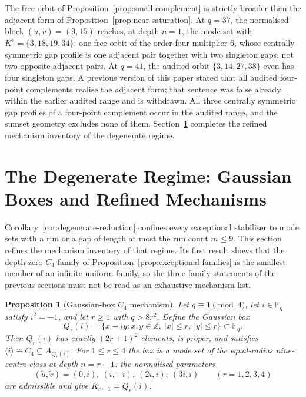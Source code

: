 \documentclass[11pt,a4paper]{article}
\newtheorem{proposition}[theorem]{Proposition}
\theoremstyle{definition}
\theoremstyle{remark}
\newcommand{\Fq}{\mathbb{F}_q}
\begin{document}
The free orbit of Proposition~\ref{prop:small-complement} is strictly broader than the
adjacent form of Proposition~\ref{prop:near-saturation}.
At $q=37$, the normalised block $(\widetilde u,\widetilde v)=(9,15)$ reaches, at depth
$n=1$, the mode set with $K^{\mathrm{c}}=\{3,18,19,34\}$: one free orbit of the order-four
multiplier $6$, whose centrally symmetric gap profile is one adjacent pair together with
two singleton gaps, not two opposite adjacent pairs.
At $q=41$, the audited orbit $\{3,14,27,38\}$ even has four singleton gaps.
A previous version of this paper stated that all audited four-point complements realise
the adjacent form; that sentence was false already within the earlier audited range and is
withdrawn.
All three centrally symmetric gap profiles of a four-point complement occur in the audited
range, and the sumset geometry excludes none of them.
Section~\ref{sec:degenerate} completes the refined mechanism inventory of the degenerate
regime.

\section{The Degenerate Regime: Gaussian Boxes and Refined Mechanisms}
\label{sec:degenerate}

Corollary~\ref{cor:degenerate-reduction} confines every exceptional stabiliser to mode sets
with a run or a gap of length at most the run count $m\leq9$.
This section refines the mechanism inventory of that regime.
Its first result shows that the depth-zero $C_4$ family of
Proposition~\ref{prop:exceptional-families} is the smallest member of an infinite uniform
family, so the three family statements of the previous sections must not be read as an
exhaustive mechanism list.

\begin{proposition}[Gaussian-box $C_4$ mechanism]
  \label{prop:gaussian-boxes}
  Let $q\equiv1\pmod4$, let $i\in\Fq$ satisfy $i^2=-1$, and let $r\geq1$ with $q>8r^2$.
  Define the Gaussian box
  \begin{equation}
    Q_r(i)=\{x+iy:x,y\in\mathbb{Z},\ |x|\leq r,\ |y|\leq r\}\subset\Fq.
    \label{eq:gaussian-box}
  \end{equation}
  Then $Q_r(i)$ has exactly $(2r+1)^2$ elements, is proper, and satisfies
  $\langle i\rangle\cong C_4\subseteq A_{Q_r(i)}$.
  For $1\leq r\leq4$ the box is a mode set of the equal-radius nine-centre class at depth
  $n=r-1$: the normalised parameters
  \begin{equation}
    (\widetilde u,\widetilde v)=(0,i),\ (i,-i),\ (2i,i),\ (3i,i)
    \qquad(r=1,2,3,4)
    \label{eq:box-parameters}
  \end{equation}
  are admissible and give $K_{r-1}=Q_r(i)$.
\end{proposition}
\end{document}
